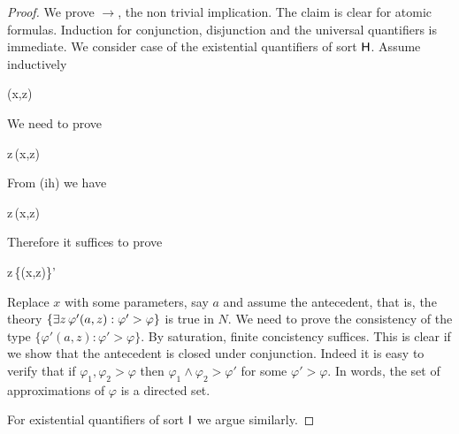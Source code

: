 \documentclass[10pt,oneside]{amsproc}
\begin{document}
\begin{proof}
  We prove $\rightarrow$, the non trivial implication.
  The claim is clear for atomic formulas.
  Induction for conjunction, disjunction and the universal quantifiers is immediate.
%
%
%
%
%
  We consider case of the existential quantifiers of sort ${\sf H}$.
  Assume inductively
  
  {\rightarrow}
  {\varphi(x,z)}

  We need to prove

  {\rightarrow}
  {\existsH z\,\varphi(x,z)}

  From (ih) we have

  {\rightarrow}
  {\existsH z\,\varphi(x,z)}

  Therefore it suffices to prove

  {\rightarrow}
  {\existsH z\,\{\varphi(x,z)\}'}

Replace $x$ with some parameters, say $a$ and assume the antecedent, that is, the theory $\{\exists z\,\varphi'(a,z):\varphi'>\varphi\}$ is true in $N$.
We need to prove the consistency of the type $\{\varphi'(a,z):\varphi'>\varphi\}$.
By saturation, finite concistency suffices.
This is clear if we show that the antecedent is closed under conjunction.
Indeed it is easy to verify that if $\varphi_1,\varphi_2>\varphi$ then $\varphi_1\wedge\varphi_2>\varphi'$ for some $\varphi'>\varphi$.
In words, the set of approximations of $\varphi$ is a directed set.

For existential quantifiers of sort ${\sf I}$ we argue similarly.%
%
%
%
%
%
\end{proof}
\end{document}
